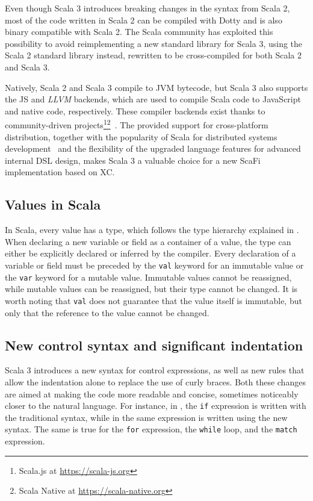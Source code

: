 Even though Scala 3 introduces breaking changes in the syntax from Scala 2, most of the code written in Scala 2 can be compiled with Dotty and is also binary compatible with Scala 2.
%
The Scala community has exploited this possibility to avoid reimplementing a new standard library for Scala 3, using the Scala 2 standard library instead, rewritten to be cross-compiled for both Scala 2 and Scala 3.

Natively, Scala 2 and Scala 3 compile to \ac{JVM} bytecode, but Scala 3 also supports the \ac{JS} and \textit{LLVM} backends, which are used to compile Scala code to JavaScript and native code, respectively.
%
These compiler backends exist thanks to community-driven projects\footnote{Scala.js at \url{https://scala-js.org}}\footnote{Scala Native at \url{https://scala-native.org}}~\cite{scala-js}.
%
The provided support for cross-platform distribution, together with the popularity of Scala for distributed systems development~\cite{scala-popularity} and the flexibility of the upgraded language features for advanced internal \ac{DSL} design, makes Scala 3 a valuable choice for a new ScaFi implementation based on \ac{XC}.

\subsection{Values in Scala}

In Scala, every value has a type, which follows the type hierarchy explained in .
%
When declaring a new variable or field as a container of a value, the type can either be explicitly declared or inferred by the compiler.
%
Every declaration of a variable or field must be preceded by the \texttt{val} keyword for an immutable value or the \texttt{var} keyword for a mutable value.
%
Immutable values cannot be reassigned, while mutable values can be reassigned, but their type cannot be changed.
%
It is worth noting that \texttt{val} does not guarantee that the value itself is immutable, but only that the reference to the value cannot be changed.


\subsection{New control syntax and significant indentation}

Scala 3 introduces a new syntax for control expressions, as well as new rules that allow the indentation alone to replace the use of curly braces.
%
Both these changes are aimed at making the code more readable and concise, sometimes noticeably closer to the natural language.
%
For instance, in , the \texttt{if} expression is written with the traditional syntax, while in  the same expression is written using the new syntax.
%
The same is true for the \texttt{for} expression, the \texttt{while} loop, and the \texttt{match} expression.

